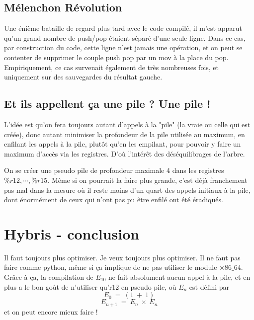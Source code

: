 \documentclass{article}
\begin{document}
\subsection{Mélenchon Révolution}
Une énième bataille de regard plus tard avec le code compilé, il m'est apparut qu'un grand nombre de push/pop étaient séparé d'une seule ligne. Dans ce cas, par construction du code, cette ligne n'est jamais une opération, et on peut se contenter de supprimer le couple push pop par un mov à la place du pop. Empiriquement, ce cas survenait également de très nombreuses fois, et uniquement sur des sauvegardes du résultat gauche.

\subsection{Et ils appellent ça une pile ? Une pile !}
L'idée est qu'on fera toujours autant d'appels à la "pile" (la vraie ou celle qui est créée), donc autant minimiser la profondeur de la pile utilisée au maximum, en enfilant les appels à la pile, plutôt qu'en les empilant, pour pouvoir y faire un maximum d'accès via les registres. D'où l'intérêt des déséquilibrages de l'arbre.

On se créer une pseudo pile de profondeur maximale 4 dans les registres $\%r12,\cdots,\%r15$. Même si on pourrait la faire plus grande, c'est déjà franchement pas mal dans la mesure où il reste moins d'un quart des appels initiaux à la pile, dont énormément de ceux qui n'ont pas pu être enfilé ont été éradiqués.


\section{Hybris - conclusion}

Il faut toujours plus optimiser. Je veux toujours plus optimiser. Il ne faut pas faire comme python, même si ça implique de ne pas utiliser le module $\times86\_64$. Grâce à ça, la compilation de $E_{10}$ ne fait absolument aucun appel à la pile, et en plus a le bon goût de n'utiliser qu'r12 en pseudo pile, où $E_n$ est défini par \[ E_0\ =\ (1\ +\ 1) \]\[ E_{n+1}\ =\ E_n\ \times\ E_n \] et on peut encore mieux faire !
\end{document}

